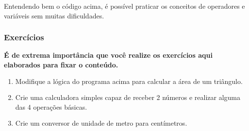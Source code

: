Entendendo bem o código acima, é possível praticar os conceitos de operadores 
e variáveis sem muitas dificuldades.

\subsubsection{Exercícios}

\textbf{É de extrema importância que você realize os exercícios aqui 
elaborados para fixar o conteúdo.}

\begin{enumerate}
    \item{Modifique a lógica do programa acima para calcular a área de um 
        triângulo.}
    \item{Crie uma calculadora simples capaz de receber 2 números e realizar 
        alguma das 4 operações básicas.}
    \item{Crie um conversor de unidade de metro para centímetros.}
\end{enumerate}
